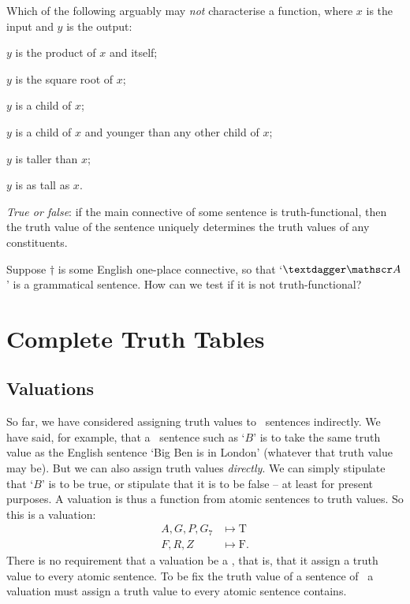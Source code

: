 \practiceproblems

\problempart Which of the following arguably may \emph{not} characterise a function, where $x$ is the input and $y$ is the output: \begin{earg}
	\item $y$ is the product of $x$ and itself;
	\item $y$ is the square root of $x$;
	\item $y$ is a child of $x$;
	\item $y$ is a child of $x$ and younger than any other child of $x$;
	\item $y$ is taller than $x$;
	\item $y$ is as tall as $x$. 
\end{earg}  
\problempart
\emph{True or false}: if the main connective of some sentence is truth-functional, then the truth value of the sentence uniquely determines the truth values of any constituents.

\problempart Suppose $†$ is some English one-place connective, so that `$†\meta{A}$' is a grammatical sentence. How can we test if it is not truth-functional?



\chapter{Complete Truth Tables}\label{s:CompleteTruthTables}

\section{Valuations}\label{s:valuations}

So far, we have considered assigning truth values to \TFL\ sentences indirectly. We have said, for example, that a \TFL\ sentence such as `$B$' is to take the same truth value as the English sentence `Big Ben is in London' (whatever that truth value may be). But we can also assign truth values \emph{directly}. We can simply stipulate that `$B$' is to be true, or stipulate that it is to be false – at least for present purposes. 
A valuation is thus a function from atomic sentences to truth values. So this is a valuation: \begin{align*}
	A, G, P, G_{7}  &\mapsto \mathrm{T}\\ 
	F, R, Z &\mapsto \mathrm{F}.
\end{align*} There is no requirement that a valuation be a , that is, that it assign a truth value to every atomic sentence. To be fix the truth value of a sentence  of \TFL\ a valuation must assign a truth value to every atomic sentence  contains.


